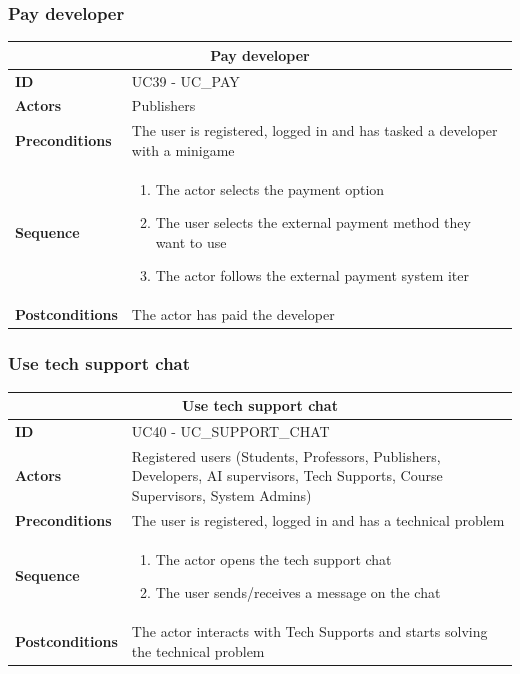\subsubsection{Pay developer}
\begin{tabular}{|m{2.5cm}|m{8cm}|}
	\hline
	\multicolumn{2}{|c|}{Pay developer} \\
	\hline
	\textbf{ID} & UC39 - UC\_PAY \\
	\hline
	\textbf{Actors} & Publishers \\
	\hline
	\textbf{Preconditions} & The user is registered, logged in and has tasked a developer with a minigame \\
	\hline
	\textbf{Sequence} & 
	\begin{enumerate}
		\item The actor selects the payment option
		\item The user selects the external payment method they want to use
		\item The actor follows the external payment system iter
	\end{enumerate} \\
	\hline
	\textbf{Postconditions} & The actor has paid the developer \\
	\hline
\end{tabular}

\subsubsection{Use tech support chat}
\begin{tabular}{|m{2.5cm}|m{8cm}|}
	\hline
	\multicolumn{2}{|c|}{Use tech support chat} \\
	\hline
	\textbf{ID} & UC40 - UC\_SUPPORT\_CHAT \\
	\hline
	\textbf{Actors} & Registered users (Students, Professors, Publishers, Developers, AI supervisors, Tech Supports, Course Supervisors, System Admins) \\
	\hline
	\textbf{Preconditions} & The user is registered, logged in and has a technical problem \\
	\hline
	\textbf{Sequence} & 
	\begin{enumerate}
		\item The actor opens the tech support chat
		\item The user sends/receives a message on the chat
	\end{enumerate} \\
	\hline
	\textbf{Postconditions} & The actor interacts with Tech Supports and starts solving the technical problem \\
	\hline
\end{tabular}

